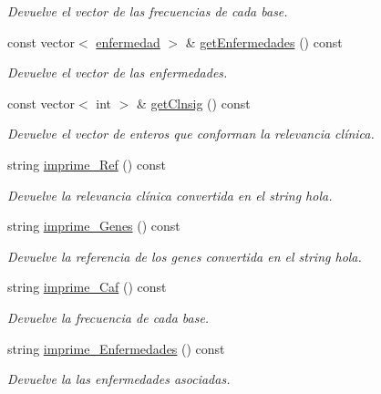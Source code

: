 \begin{DoxyCompactItemize}
\begin{DoxyCompactList}\small\item\em Devuelve el vector de las frecuencias de cada base. \end{DoxyCompactList}\item 
const vector$<$ \hyperlink{classenfermedad}{enfermedad} $>$ \& \hyperlink{classmutacion_adf4c260fe49a9cc152bfe4be855304e4}{get\+Enfermedades} () const
\begin{DoxyCompactList}\small\item\em Devuelve el vector de las enfermedades. \end{DoxyCompactList}\item 
const vector$<$ int $>$ \& \hyperlink{classmutacion_a216068275eb221c01ce336de99b6d517}{get\+Clnsig} () const
\begin{DoxyCompactList}\small\item\em Devuelve el vector de enteros que conforman la relevancia clínica. \end{DoxyCompactList}\item 
string \hyperlink{classmutacion_a1533331f8cccf92c2b6468c0ec21a391}{imprime\+\_\+\+Ref} () const
\begin{DoxyCompactList}\small\item\em Devuelve la relevancia clínica convertida en el string hola. \end{DoxyCompactList}\item 
string \hyperlink{classmutacion_a9da6a306521e0ed298ec1f178ecc91cc}{imprime\+\_\+\+Genes} () const
\begin{DoxyCompactList}\small\item\em Devuelve la referencia de los genes convertida en el string hola. \end{DoxyCompactList}\item 
string \hyperlink{classmutacion_a820234fdc96bcce212c1ff3c2f42d084}{imprime\+\_\+\+Caf} () const
\begin{DoxyCompactList}\small\item\em Devuelve la frecuencia de cada base. \end{DoxyCompactList}\item 
string \hyperlink{classmutacion_a5814ecb09adcac85f44d6e5fd1f6faf7}{imprime\+\_\+\+Enfermedades} () const
\begin{DoxyCompactList}\small\item\em Devuelve la las enfermedades asociadas. \end{DoxyCompactList}\item 

\end{DoxyCompactItemize}
